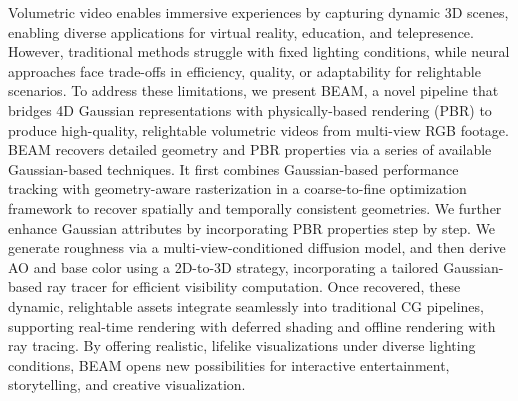 Volumetric video enables immersive experiences by capturing dynamic 3D scenes, enabling diverse applications for virtual reality, education, and telepresence. However, traditional methods struggle with fixed lighting conditions, while neural approaches face trade-offs in efficiency, quality, or adaptability for relightable scenarios. To address these limitations, we present BEAM, a novel pipeline that bridges 4D Gaussian representations with physically-based rendering (PBR) to produce high-quality, relightable volumetric videos from multi-view RGB footage. BEAM recovers detailed geometry and PBR properties via a series of available Gaussian-based techniques. It first combines Gaussian-based performance tracking with geometry-aware rasterization in a coarse-to-fine optimization framework to recover spatially and temporally consistent geometries. We further enhance Gaussian attributes by incorporating PBR properties step by step. We generate roughness via a multi-view-conditioned diffusion model, and then derive AO and base color using a 2D-to-3D strategy, incorporating a tailored Gaussian-based ray tracer for efficient visibility computation. 
Once recovered, these dynamic, relightable assets integrate seamlessly into traditional CG pipelines, supporting real-time rendering with deferred shading and offline rendering with ray tracing. By offering realistic, lifelike visualizations under diverse lighting conditions, BEAM opens new possibilities for interactive entertainment, storytelling, and creative visualization.
